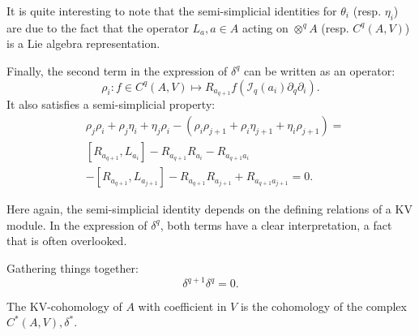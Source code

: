 \begin{rem}
    It is quite interesting to note that the semi-simplicial identities for $\theta_i$ (resp. $\eta_i$) are due to the fact that the operator $L_a, a \in A $ acting on $\otimes^q A$ (resp. $C^q(A,V)$) is a Lie algebra representation. 
\end{rem}
Finally, the second term in the expression of $\delta^q$ can be written as an operator:
\begin{equation}
    \label{eq:rho_operator}
    \rho_i \colon f \in C^q(A,V) \mapsto R_{a_{q+1}} f\left(\mathcal{I}_q(a_i)\partial_q \partial_i\right).
\end{equation}
It also satisfies a semi-simplicial property:
\begin{equation}
    \label{eq:rho_semi_simplicial}
    \begin{split}
    &\rho_j \rho_i + \rho_j \eta_i + \eta_j \rho_i - \left( \rho_i \rho_{j+1} + \rho_i \eta_{j+1} + \eta_i \rho_{j+1} \right) = \\
    &\left[ R_{a_{q+1}},L_{a_i}\right] - R_{a_{q+1}}R_{a_i} -R_{a_{q+1}a_i}  \\
    &-\left[ R_{a_{q+1}},L_{a_{j+1}}\right] - R_{a_{q+1}}R_{a_{j+1}}+ R_{a_{q+1}a_{j+1}}  = 0.
    \end{split}
\end{equation}
\begin{rem}
Here again, the semi-simplicial identity depends on the defining relations of a KV module. In the expression of $\delta^q$, both terms have a clear interpretation, a fact that is often overlooked.
\end{rem}
Gathering things together:
\begin{equation}
    \label{eq:delta_semi_simplicial}
    \delta^{q+1}\delta^q = 0.
\end{equation}

\begin{defn}
\label{def:kv_cohomology}
The KV-cohomology of $A$ with coefficient in $V$ is the cohomology of the complex $C^*\left( A,V \right), \delta^*.$
\end{defn}
